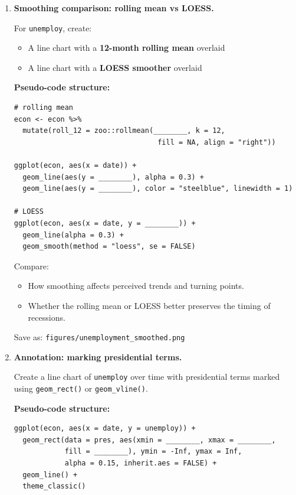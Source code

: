 \documentclass[11pt]{article}
\begin{document}
\begin{enumerate}
Save as:
\begin{itemize}
  \item \texttt{figures/unemployment\_line.png}
\end{itemize}

\item \textbf{Smoothing comparison: rolling mean vs LOESS.}

For \texttt{unemploy}, create:
\begin{itemize}
  \item A line chart with a \textbf{12-month rolling mean} overlaid
  \item A line chart with a \textbf{LOESS smoother} overlaid
\end{itemize}

\textbf{Pseudo-code structure:}

\begin{verbatim}
# rolling mean
econ <- econ %>%
  mutate(roll_12 = zoo::rollmean(________, k = 12,
                                  fill = NA, align = "right"))

ggplot(econ, aes(x = date)) +
  geom_line(aes(y = ________), alpha = 0.3) +
  geom_line(aes(y = ________), color = "steelblue", linewidth = 1)

# LOESS
ggplot(econ, aes(x = date, y = ________)) +
  geom_line(alpha = 0.3) +
  geom_smooth(method = "loess", se = FALSE)
\end{verbatim}

Compare:
\begin{itemize}
  \item How smoothing affects perceived trends and turning points.
  \item Whether the rolling mean or LOESS better preserves the timing of recessions.
\end{itemize}

Save as:
\texttt{figures/unemployment\_smoothed.png}

\item \textbf{Annotation: marking presidential terms.}

Create a line chart of \texttt{unemploy} over time with presidential terms marked using \texttt{geom\_rect()} or \texttt{geom\_vline()}.

\textbf{Pseudo-code structure:}

\begin{verbatim}
ggplot(econ, aes(x = date, y = unemploy)) +
  geom_rect(data = pres, aes(xmin = ________, xmax = ________,
            fill = ________), ymin = -Inf, ymax = Inf,
            alpha = 0.15, inherit.aes = FALSE) +
  geom_line() +
  theme_classic()
\end{verbatim}


\end{enumerate}
\end{document}
